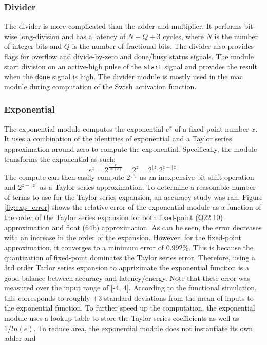 \documentclass[12pt, hidelinks]{article}
\begin{document}
\subsubsection{Divider}
The divider is more complicated than the adder and multiplier. It performs bit-wise long-division and has a latency of $N+Q+3$ cycles, where $N$ is the number of integer bits and $Q$ is the number of fractional
bits. The divider also provides flags for overflow and divide-by-zero and done/busy status signals. The module start division on an active-high pulse of the \texttt{start} signal and provides the result when the
\texttt{done} signal is high. The divider module is mostly used in the \ac{mac} module during computation of the Swish activation function.

\subsubsection{Exponential}
The exponential module computes the exponential $e^{x}$ of a fixed-point number $x$. It uses a combination of the identities of exponential and a Taylor series approximation around zero to compute the exponential.
Specifically, the module transforms the exponential as such:
\begin{equation}
    e^{x} = 2^{\frac{x}{\ln(e)}} = 2^{z} = 2^{\lfloor{z}\rfloor}2^{z-\lfloor{z}\rfloor}
\end{equation}
\label{eq:exp_transform}
The compute can then easily compute $2^{\lfloor{z}\rfloor}$ as an inexpensive bit-shift operation and $2^{z-\lfloor{z}\rfloor}$ as a Taylor series approximation. To determine a reasonable number of terms to use
for the Taylor series expansion, an accuracy study was ran. Figure \ref{fig:exp_error} shows the relative error of the exponential module as a function of the order of the Taylor series expansion for both fixed-point (Q22.10)
approximation and float (64b) approximation. As can be seen, the error decreases with an increase in the order of the expansion. However, for the fixed-point approximation, it converges to a minimum error of \~0.992\%. This
is because the quantization of fixed-point dominates the Taylor series error. Therefore, using a 3rd order Tarlor series expansion to appriximate the exponential function is a good balance between accuracy and latency/energy.
Note that these error was measured over the input range of [-4, 4]. According to the functional simulation, this corresponds to roughly $\pm3$ standard deviations from the mean of inputs to the exponential function.
To further speed up the computation, the exponential module uses a lookup table to store the Taylor series coefficients as well as $1/ln(e)$. To reduce area, the exponential module does not instantiate its own adder and
\end{document}
